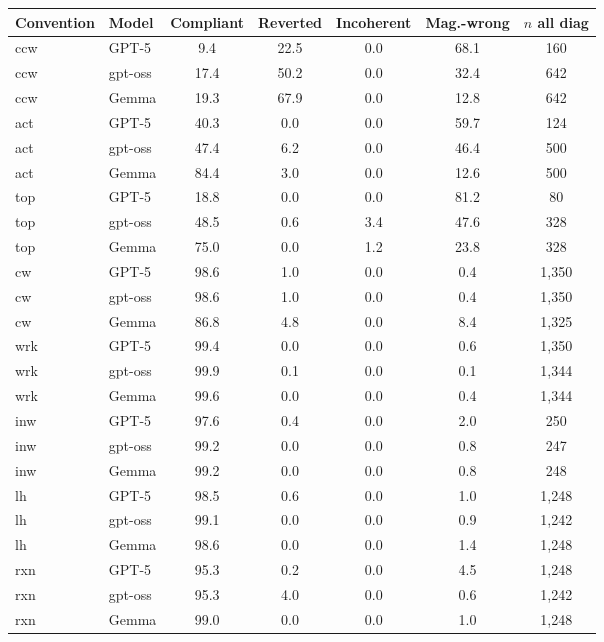\begin{tabular}{llccccc}
\toprule
Convention & Model & Compliant & Reverted & Incoherent & Mag.-wrong & $n$ all diag \\
\midrule
ccw & GPT-5 & 9.4 & 22.5 & 0.0 & 68.1 & 160 \\
ccw & gpt-oss & 17.4 & 50.2 & 0.0 & 32.4 & 642 \\
ccw & Gemma & 19.3 & 67.9 & 0.0 & 12.8 & 642 \\
act & GPT-5 & 40.3 & 0.0 & 0.0 & 59.7 & 124 \\
act & gpt-oss & 47.4 & 6.2 & 0.0 & 46.4 & 500 \\
act & Gemma & 84.4 & 3.0 & 0.0 & 12.6 & 500 \\
top & GPT-5 & 18.8 & 0.0 & 0.0 & 81.2 & 80 \\
top & gpt-oss & 48.5 & 0.6 & 3.4 & 47.6 & 328 \\
top & Gemma & 75.0 & 0.0 & 1.2 & 23.8 & 328 \\
cw & GPT-5 & 98.6 & 1.0 & 0.0 & 0.4 & 1,350 \\
cw & gpt-oss & 98.6 & 1.0 & 0.0 & 0.4 & 1,350 \\
cw & Gemma & 86.8 & 4.8 & 0.0 & 8.4 & 1,325 \\
wrk & GPT-5 & 99.4 & 0.0 & 0.0 & 0.6 & 1,350 \\
wrk & gpt-oss & 99.9 & 0.1 & 0.0 & 0.1 & 1,344 \\
wrk & Gemma & 99.6 & 0.0 & 0.0 & 0.4 & 1,344 \\
inw & GPT-5 & 97.6 & 0.4 & 0.0 & 2.0 & 250 \\
inw & gpt-oss & 99.2 & 0.0 & 0.0 & 0.8 & 247 \\
inw & Gemma & 99.2 & 0.0 & 0.0 & 0.8 & 248 \\
lh & GPT-5 & 98.5 & 0.6 & 0.0 & 1.0 & 1,248 \\
lh & gpt-oss & 99.1 & 0.0 & 0.0 & 0.9 & 1,242 \\
lh & Gemma & 98.6 & 0.0 & 0.0 & 1.4 & 1,248 \\
rxn & GPT-5 & 95.3 & 0.2 & 0.0 & 4.5 & 1,248 \\
rxn & gpt-oss & 95.3 & 4.0 & 0.0 & 0.6 & 1,242 \\
rxn & Gemma & 99.0 & 0.0 & 0.0 & 1.0 & 1,248 \\
\bottomrule
\end{tabular}
